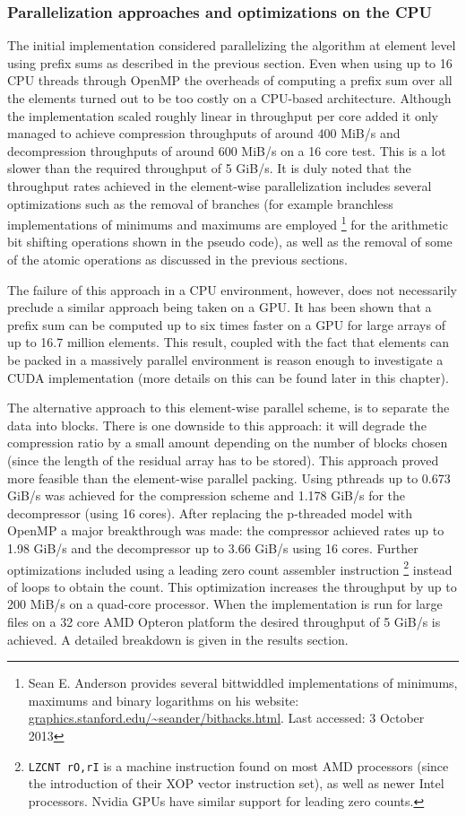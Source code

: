   \subsubsection{Parallelization approaches and optimizations on the CPU}
  The initial implementation considered parallelizing the algorithm at element level using prefix sums as described in the previous section. Even when using up to 16 CPU threads through OpenMP the overheads of computing a prefix 
  sum over all the elements turned out to be too costly on a CPU-based architecture. Although the implementation scaled roughly linear in throughput per core added it only managed to achieve compression throughputs of around 
  400 MiB/s and decompression throughputs of around 600 MiB/s on a 16 core test. This is a lot slower than the required throughput of 5 GiB/s. It is duly noted that the throughput rates achieved in the element-wise parallelization 
  includes several optimizations such as the removal of branches (for example branchless implementations of minimums and maximums are employed \footnote{Sean E. Anderson 
  provides several bittwiddled implementations of minimums, maximums and binary logarithms on his website: \url{graphics.stanford.edu/~seander/bithacks.html}. Last accessed: 3 
  October 2013} for the arithmetic bit shifting operations shown in the pseudo code), as well as the removal of some of the atomic operations as discussed in the previous sections.
  
  The failure of this approach in a CPU environment, however, does not necessarily preclude a similar approach being taken on a GPU. It has been shown \cite{harris2007parallel} that a 
  prefix sum can be computed up to six times faster on a GPU for large arrays of up to 16.7 million elements. This result, coupled with the fact that elements can be packed in a massively
  parallel environment is reason enough to investigate a CUDA implementation (more details on this can be found later in this chapter).
  
  The alternative approach to this element-wise parallel scheme, is to separate the data into blocks. There is one downside to this approach: it will degrade the compression
  ratio by a small amount depending on the number of blocks chosen (since the length of the residual array has to be stored). This approach proved more feasible than the 
  element-wise parallel packing. Using pthreads up to 0.673 GiB/s was achieved for the compression scheme and 1.178 GiB/s for the decompressor (using 16 cores). After replacing
  the p-threaded model with OpenMP a major breakthrough was made: the compressor achieved rates up to 1.98 GiB/s and the decompressor up to 3.66 GiB/s using 16 cores. Further 
  optimizations included using a leading zero count assembler instruction \footnote{\texttt{LZCNT rO,rI} is a machine instruction found on most AMD processors (since the 
  introduction of their XOP vector instruction set), as well as newer Intel processors. Nvidia GPUs have similar support for leading zero counts.} instead of loops to obtain 
  the count. This optimization increases the throughput by up to 200 MiB/s on a quad-core processor. When the implementation is run for large files on a 32 core AMD Opteron platform
  the desired throughput of 5 GiB/s is achieved. A detailed breakdown is given in the results section.
